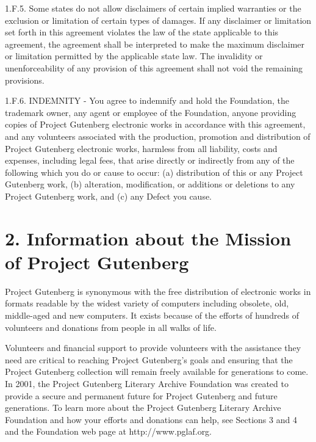 1.F.5.  Some states do not allow disclaimers of certain implied
warranties or the exclusion or limitation of certain types of damages.
If any disclaimer or limitation set forth in this agreement violates the
law of the state applicable to this agreement, the agreement shall be
interpreted to make the maximum disclaimer or limitation permitted by
the applicable state law.  The invalidity or unenforceability of any
provision of this agreement shall not void the remaining provisions.

1.F.6.  INDEMNITY - You agree to indemnify and hold the Foundation, the
trademark owner, any agent or employee of the Foundation, anyone
providing copies of Project Gutenberg\texttrademark{} electronic works in accordance
with this agreement, and any volunteers associated with the production,
promotion and distribution of Project Gutenberg\texttrademark{} electronic works,
harmless from all liability, costs and expenses, including legal fees,
that arise directly or indirectly from any of the following which you do
or cause to occur: (a) distribution of this or any Project Gutenberg\texttrademark{}
work, (b) alteration, modification, or additions or deletions to any
Project Gutenberg\texttrademark{} work, and (c) any Defect you cause.


\section*{2. Information about the Mission of Project Gutenberg\texttrademark{}}

Project Gutenberg\texttrademark{} is synonymous with the free distribution of
electronic works in formats readable by the widest variety of computers
including obsolete, old, middle-aged and new computers.  It exists
because of the efforts of hundreds of volunteers and donations from
people in all walks of life.

Volunteers and financial support to provide volunteers with the
assistance they need are critical to reaching Project Gutenberg\texttrademark{}'s
goals and ensuring that the Project Gutenberg\texttrademark{} collection will
remain freely available for generations to come.  In 2001, the Project
Gutenberg Literary Archive Foundation was created to provide a secure
and permanent future for Project Gutenberg\texttrademark{} and future generations.
To learn more about the Project Gutenberg Literary Archive Foundation
and how your efforts and donations can help, see Sections 3 and 4
and the Foundation web page at http://www.pglaf.org.


